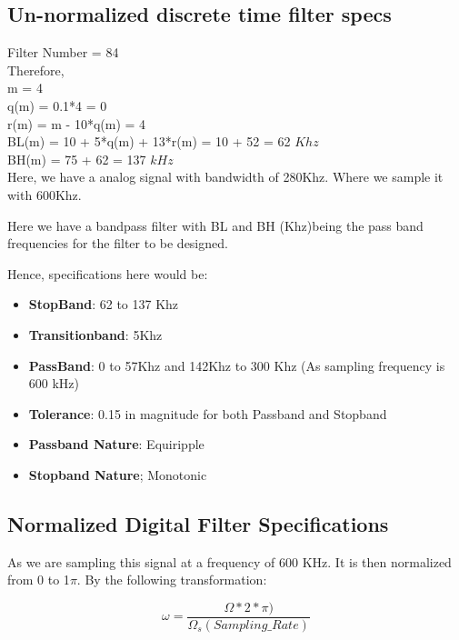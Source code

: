 \documentclass{scrartcl}
\begin{document}
\subsection{Un-normalized discrete time filter specs}

Filter Number = 84\\
Therefore,\\
m = 4\\
q(m) = 0.1*4 = 0\\
r(m) = m - 10*q(m) = 4\\
BL(m) = 10 + 5*q(m) + 13*r(m) = 10 + 52 = 62 $Khz$\\
BH(m) = 75 + 62 = 137 $kHz$\\

Here, we have a analog signal with bandwidth of 280Khz. Where we sample it with 600Khz.

Here we have a bandpass filter with BL and BH (Khz)being the pass band frequencies for the filter to be designed. 

Hence, specifications here would be:
\begin{itemize}

\item \textbf{StopBand}: 62 to 137 Khz

\item \textbf{Transitionband}: 5Khz

\item \textbf{PassBand}: 0 to 57Khz and 142Khz to 300 Khz (As sampling frequency is 600 kHz)

\item \textbf{Tolerance}: 0.15 in magnitude for both Passband and Stopband

\item \textbf{Passband Nature}: Equiripple

\item \textbf{Stopband Nature}; Monotonic

\end{itemize}

\subsection{Normalized Digital Filter Specifications}

As we are sampling this signal at a frequency of 600 KHz. It is then normalized from 0 to   1$\pi$. By the following transformation:

\begin{equation}
    \omega = \frac{\Omega * 2 * \pi)}{\Omega_{s}(Sampling\_Rate)}
\end{equation}
\end{document}
